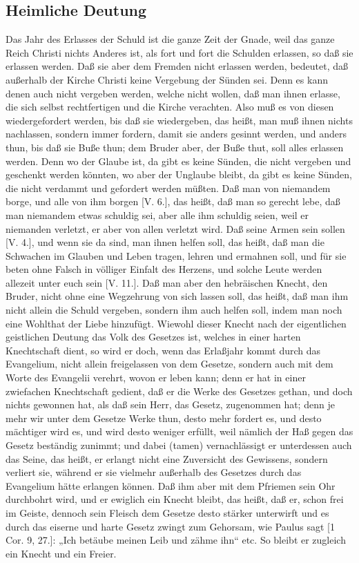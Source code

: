 \subsection{Heimliche Deutung}

Das Jahr des Erlasses der Schuld ist die ganze Zeit der Gnade, weil das ganze Reich Christi nichts Anderes ist, als fort und fort die Schulden erlassen, so daß sie erlassen werden. Daß sie aber dem Fremden nicht erlassen werden, bedeutet, daß außerhalb der Kirche Christi keine Vergebung der Sünden sei. Denn es kann denen auch nicht vergeben werden, welche nicht wollen, daß man ihnen erlasse, die sich selbst rechtfertigen und die Kirche verachten. Also muß es von diesen wiedergefordert werden, bis daß sie wiedergeben, das heißt, man muß ihnen nichts nachlassen, sondern immer fordern, damit sie anders gesinnt werden, und anders thun, bis daß sie Buße thun; dem Bruder aber, der Buße thut, soll alles erlassen werden. Denn wo der Glaube ist, da gibt es keine Sünden, die nicht vergeben und geschenkt werden könnten, wo aber der Unglaube bleibt, da gibt es keine Sünden, die nicht verdammt und gefordert werden müßten. Daß man von niemandem borge, und alle von ihm borgen [V. 6.], das heißt, daß man so gerecht lebe, daß man niemandem etwas schuldig sei, aber alle ihm schuldig seien, weil er niemanden verletzt, er aber von allen verletzt wird. Daß seine Armen sein sollen [V. 4.], und wenn sie da sind, man ihnen helfen soll, das heißt, daß man die Schwachen im Glauben und Leben tragen, lehren und ermahnen soll, und für sie beten ohne Falsch in völliger Einfalt des Herzens, und solche Leute werden allezeit unter euch sein [V. 11.]. Daß man aber den hebräischen Knecht, den Bruder, nicht ohne eine Wegzehrung von sich lassen soll, das heißt, daß man ihm nicht allein die Schuld vergeben, sondern ihm auch helfen soll, indem man noch eine Wohlthat der Liebe hinzufügt. Wiewohl dieser Knecht nach der eigentlichen geistlichen Deutung das Volk des Gesetzes ist, welches in einer harten Knechtschaft dient, so wird er doch, wenn das Erlaßjahr kommt durch das Evangelium, nicht allein freigelassen von dem Gesetze, sondern auch mit dem Worte des Evangelii verehrt, wovon er leben kann; denn er hat in einer zwiefachen Knechtschaft gedient, daß er die Werke des Gesetzes gethan, und doch nichts gewonnen hat, als daß sein Herr, das Gesetz, zugenommen hat; denn je mehr wir unter dem Gesetze Werke thun, desto mehr fordert es, und desto mächtiger wird es, und wird desto weniger erfüllt, weil nämlich der Haß gegen das Gesetz beständig zunimmt; und dabei (tamen) vernachlässigt er unterdessen auch das Seine, das heißt, er erlangt nicht eine Zuversicht des Gewissens, sondern verliert sie, während er sie vielmehr außerhalb des Gesetzes durch das Evangelium hätte erlangen können. Daß ihm aber mit dem Pfriemen sein Ohr durchbohrt wird, und er ewiglich ein Knecht bleibt, das heißt, daß er, schon frei im Geiste, dennoch sein Fleisch dem Gesetze desto stärker unterwirft und es durch das eiserne und harte Gesetz zwingt zum Gehorsam, wie Paulus sagt [1 Cor. 9, 27.]: „Ich betäube meinen Leib und zähme ihn“ etc. So bleibt er zugleich ein Knecht und ein Freier.

